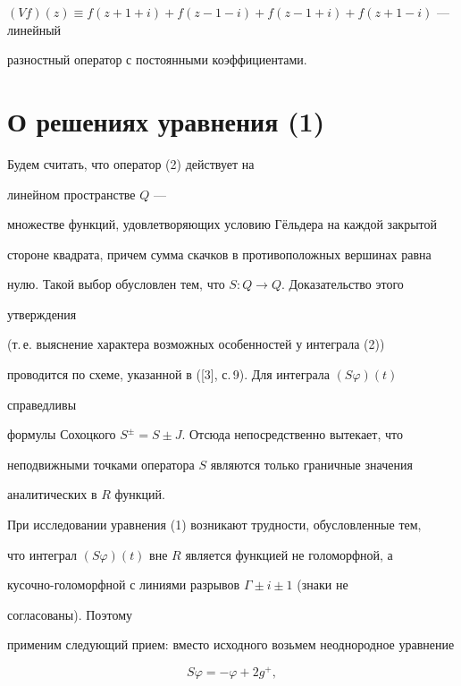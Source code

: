 $(Vf)(z)\equiv f(z+1+i)+f(z-1-i)+f(z-1+i)+f(z+1-i)$ --- линейный 


разностный оператор с постоянными коэффициентами. 


 


 


\section{О решениях уравнения (1)} 


 


Будем считать, что оператор (2) действует на 


линейном пространстве $Q$ --- 


множестве функций, удовлетворяющих условию Г\"ельдера на каждой закрытой 


стороне квадрата, причем сумма скачков в противоположных вершинах равна 


нулю. Такой выбор обусловлен тем, что $S:Q\to Q$. Доказательство этого 


утверждения 


(т.\,е. выяснение характера возможных особенностей у интеграла (2)) 


проводится по схеме, указанной в ([3], с.\,9). Для интеграла $(S\varphi)(t)$ 


справедливы 


формулы Сохоцкого $S^\pm=S\pm J$. Отсюда непосредственно вытекает, что 


неподвижными точками оператора $S$ являются только граничные значения 


аналитических в $R$ функций. 


 


При исследовании уравнения (1) возникают трудности, обусловленные тем, 


что интеграл $(S\varphi)(t)$ вне $R$ является функцией не голоморфной, а 


кусочно-голоморфной с линиями разрывов $\Gamma\pm i\pm1$ (знаки не


согласованы). Поэтому 


применим следующий прием: вместо исходного возьмем неоднородное уравнение 


\begin{equation} 


S\varphi=-\varphi+2g^+, 


\end{equation} 


